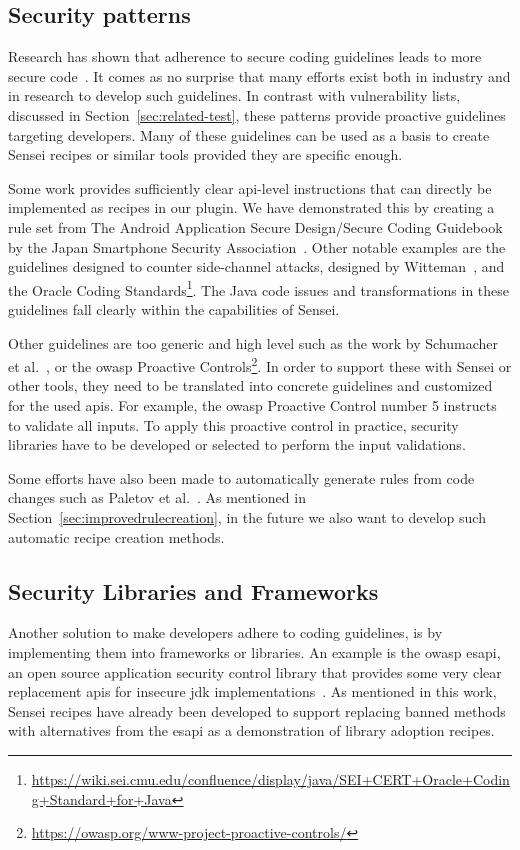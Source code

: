 \subsection{Security patterns}
Research has shown that adherence to secure coding guidelines leads to more secure code~\cite{lipfordimpact}.
It comes as no surprise that many efforts exist both in industry and in research to develop such guidelines.
In contrast with vulnerability lists, discussed in Section~\ref{sec:related-test}, these patterns provide proactive guidelines targeting developers.
Many of these guidelines can be used as a basis to create Sensei recipes or similar tools provided they are specific enough.

Some work provides sufficiently clear \gls{api}-level instructions that can directly be implemented as recipes in our plugin.
We have demonstrated this by creating a rule set from The Android Application Secure Design/Secure Coding Guidebook by the Japan Smartphone Security Association~\cite{jssec}.
Other notable examples are the guidelines designed to counter side-channel attacks, designed by Witteman~\cite{witteman2008secure}, and the Oracle Coding Standards\footnote{\url{https://wiki.sei.cmu.edu/confluence/display/java/SEI+CERT+Oracle+Coding+Standard+for+Java}}.
The Java code issues and transformations in these guidelines fall clearly within the capabilities of Sensei.

Other  guidelines are too generic and high level such as the work by Schumacher et al.~\cite{schumacher2013security}, or the \gls{owasp} Proactive Controls\footnote{\url{https://owasp.org/www-project-proactive-controls/}}.
In order to support these with Sensei or other tools, they need to be translated into concrete guidelines and customized for the used \glspl{api}.
For example, the \gls{owasp} Proactive Control number 5 instructs to validate all inputs.
To apply this proactive control in practice, security libraries have to be developed or selected to perform the input validations.

Some efforts have also been made to automatically generate rules from code changes such as Paletov et al.~\cite{paletov2018inferring}.
As mentioned in Section~\ref{sec:improvedrulecreation}, in the future we also want to develop such automatic recipe creation methods.

\subsection{Security Libraries and Frameworks}
Another solution to make developers adhere to coding guidelines, is by implementing them into frameworks or libraries.
An example is the \gls{owasp} \gls{esapi}, an open source application security control library that provides some very clear replacement \glspl{api} for insecure \gls{jdk} implementations~\cite{ESAPI}.
As mentioned in this work, Sensei recipes have already been developed to support replacing banned methods with alternatives from the \gls{esapi} as a demonstration of library adoption recipes. 

